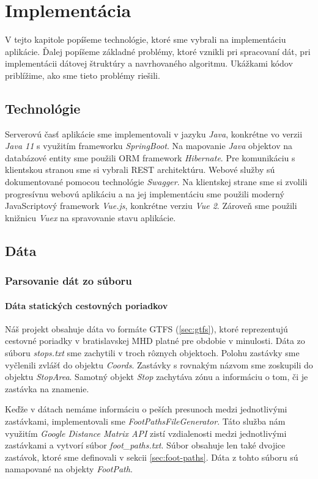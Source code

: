 \chapter{Implementácia}
\label{kap:imp}
V tejto kapitole popíšeme technológie, ktoré sme vybrali na implementáciu aplikácie. Ďalej popíšeme základné problémy, ktoré vznikli pri spracovaní dát, pri implementácii dátovej štruktúry a navrhovaného algoritmu. Ukážkami kódov priblížime, ako sme tieto problémy riešili. 

\section{Technológie}
Serverovú časť aplikácie sme implementovali v jazyku \textit{Java}, konkrétne vo verzii \textit{Java 11} s využitím frameworku \textit{SpringBoot}. Na mapovanie \textit{Java} objektov na databázové entity sme použili ORM framework \textit{Hibernate}. Pre komunikáciu s klientskou stranou sme si vybrali REST architektúru. Webové služby sú dokumentované pomocou technológie \textit{Swagger}. Na klientskej strane sme si zvolili progresívnu webovú aplikáciu a na jej implementáciu sme použili moderný JavaScriptový framework \textit{Vue.js}, konkrétne verziu \textit{Vue 2}. Zároveň sme použili knižnicu \textit{Vuex} na spravovanie stavu aplikácie. 

\section{Dáta}
\subsection{Parsovanie dát zo súboru}
\label{sec:parsing}
\subsubsection{Dáta statických cestovných poriadkov}
Náš projekt obsahuje dáta vo formáte GTFS (\ref{sec:gtfs}), ktoré reprezentujú cestovné poriadky v bratislavskej MHD platné pre obdobie v minulosti. 
Dáta zo súboru \textit{stops.txt} sme zachytili v troch rôznych objektoch. Polohu zastávky sme vyčlenili zvlášť do objektu \textit{Coords}. Zastávky s rovnakým názvom sme zoskupili do objektu \textit{StopArea}. Samotný objekt \textit{Stop} zachytáva zónu a informáciu o tom, či je zastávka na znamenie. 

Keďže v dátach nemáme informáciu o peších presunoch medzi jednotlivými zastávkami, implementovali sme \textit{FootPathsFileGenerator}. Táto služba nám využitím \textit{Google Distance Matrix API} zistí vzdialenosti medzi jednotlivými zastávkami a vytvorí súbor \textit{foot\_paths.txt}. Súbor obsahuje len také dvojice zastávok, ktoré sme definovali v sekcii \ref{sec:foot-paths}. Dáta z tohto súboru sú namapované na objekty \textit{FootPath}. 

